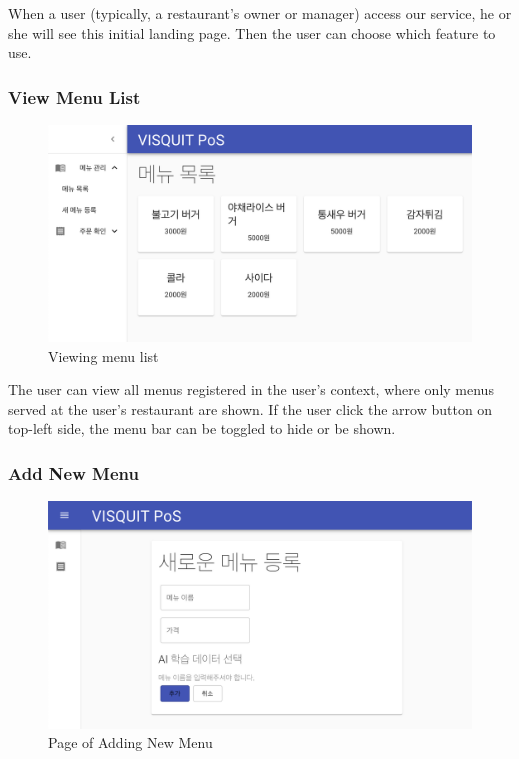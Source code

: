 \documentclass[conference,compsoc]{IEEEtran}
\begin{document}
When a user (typically, a restaurant's owner or manager) access our service, he or she will see this initial landing page. Then the user can choose which feature to use.

\subsubsection{View Menu List}

\begin{figure}[h!]
  \includegraphics[width=\linewidth]{figures/frontend/02-menulist.png}
  \caption{Viewing menu list}
  \label{fig:02-menulist}
\end{figure}

The user can view all menus registered in the user's context, where only menus served at the user's restaurant are shown. If the user click the arrow button on top-left side, the menu bar can be toggled to hide or be shown.

\subsubsection{Add New Menu}

\begin{figure}[h!]
  \includegraphics[width=\linewidth]{figures/frontend/03-newmenu-landing.png}
  \caption{Page of Adding New Menu}
  \label{fig:03-newmenu-landing}
\end{figure}
\end{document}
